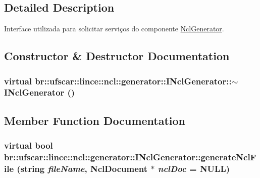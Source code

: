 \subsection{Detailed Description}
Interface utilizada para solicitar serviços do componente \hyperlink{classbr_1_1ufscar_1_1lince_1_1ncl_1_1generator_1_1NclGenerator}{NclGenerator}. 

\subsection{Constructor \& Destructor Documentation}
\hypertarget{classbr_1_1ufscar_1_1lince_1_1ncl_1_1generator_1_1INclGenerator_af2769de79864c1ddc43121cc6e4359a8}{
\subsubsection[{$\sim$INclGenerator}]{\setlength{\rightskip}{0pt plus 5cm}virtual br::ufscar::lince::ncl::generator::INclGenerator::$\sim$INclGenerator ()}}
\label{classbr_1_1ufscar_1_1lince_1_1ncl_1_1generator_1_1INclGenerator_af2769de79864c1ddc43121cc6e4359a8}


\subsection{Member Function Documentation}
\hypertarget{classbr_1_1ufscar_1_1lince_1_1ncl_1_1generator_1_1INclGenerator_a9d4259cf5746aec2541681148937057b}{
\subsubsection[{generateNclFile}]{\setlength{\rightskip}{0pt plus 5cm}virtual bool br::ufscar::lince::ncl::generator::INclGenerator::generateNclFile (string {\em fileName}, \/  NclDocument $\ast$ {\em nclDoc} = {\ttfamily NULL})}}
\label{classbr_1_1ufscar_1_1lince_1_1ncl_1_1generator_1_1INclGenerator_a9d4259cf5746aec2541681148937057b}


